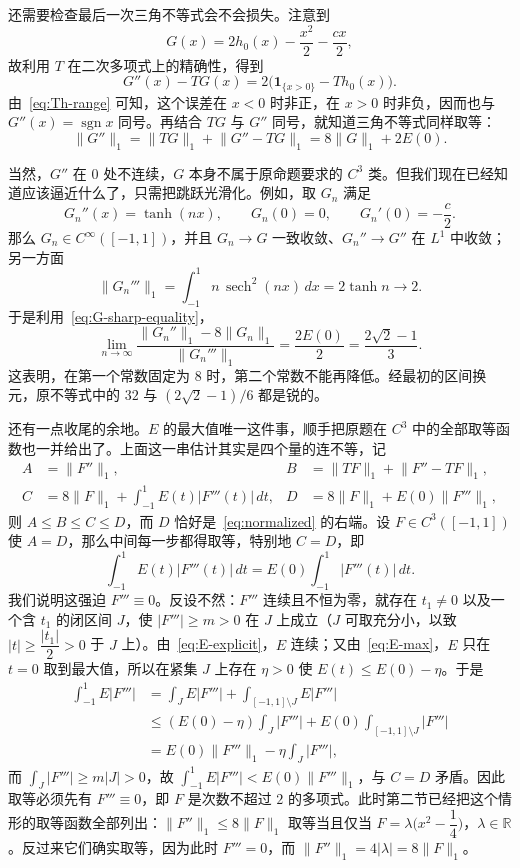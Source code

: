 \documentclass[UTF8,fontset=windows,a4paper,11pt]{ctexart}
\newcommand{\Lone}[1]{\lVert #1\rVert_1}
\begin{document}
还需要检查最后一次三角不等式会不会损失。注意到
\[
    G(x)=2h_0(x)-\frac{x^2}{2}-\frac{cx}{2},
\]
故利用 $T$ 在二次多项式上的精确性，得到
\[
    G''(x)-TG(x)=2\bigl(\mathbf1_{\{x>0\}}-Th_0(x)\bigr).
\]
由~\eqref{eq:Th-range} 可知，这个误差在 $x<0$ 时非正，在 $x>0$ 时非负，因而也与 $G''(x)=\operatorname{sgn}x$ 同号。再结合 $TG$ 与 $G''$ 同号，就知道三角不等式同样取等：
\begin{equation}
    \Lone{G''}
    =\Lone{TG}+\Lone{G''-TG}
    =8\Lone{G}+2E(0).
    \label{eq:G-sharp-equality}
\end{equation}

当然，$G''$ 在 $0$ 处不连续，$G$ 本身不属于原命题要求的 $C^3$ 类。但我们现在已经知道应该逼近什么了，只需把跳跃光滑化。例如，取 $G_n$ 满足
\[
    G_n''(x)=\tanh(nx),\qquad
    G_n(0)=0,\qquad G_n'(0)=-\frac{c}{2}.
\]
那么 $G_n\in C^{\infty}([-1,1])$，并且 $G_n\to G$ 一致收敛、$G_n''\to G''$ 在 $L^1$ 中收敛；另一方面
\[
    \Lone{G_n'''}=\int_{-1}^{1}n\,\operatorname{sech}^2(nx)\,dx
    =2\tanh n\longrightarrow2.
\]
于是利用~\eqref{eq:G-sharp-equality}，
\begin{equation}
    \lim_{n\to\infty}
    \frac{\Lone{G_n''}-8\Lone{G_n}}{\Lone{G_n'''}}
    =\frac{2E(0)}2
    =\frac{2\sqrt{2}-1}{3}.
    \label{eq:sharp-limit}
\end{equation}
这表明，在第一个常数固定为 $8$ 时，第二个常数不能再降低。经最初的区间换元，原不等式中的 $32$ 与 $(2\sqrt{2}-1)/6$ 都是锐的。

还有一点收尾的余地。$E$ 的最大值唯一这件事，顺手把原题在 $C^3$ 中的全部取等函数也一并给出了。上面这一串估计其实是四个量的连不等，记
\[
    \begin{aligned}
    A&=\Lone{F''}, & B&=\Lone{TF}+\Lone{F''-TF},\\
    C&=8\Lone{F}+\int_{-1}^{1}E(t)|F'''(t)|\,dt, &
    D&=8\Lone{F}+E(0)\Lone{F'''},
    \end{aligned}
\]
则 $A\le B\le C\le D$，而 $D$ 恰好是~\eqref{eq:normalized} 的右端。设 $F\in C^3([-1,1])$ 使 $A=D$，那么中间每一步都得取等，特别地 $C=D$，即
\[
    \int_{-1}^{1}E(t)|F'''(t)|\,dt=E(0)\int_{-1}^{1}|F'''(t)|\,dt.
\]
我们说明这强迫 $F'''\equiv0$。反设不然：$F'''$ 连续且不恒为零，就存在 $t_1\ne0$ 以及一个含 $t_1$ 的闭区间 $J$，使 $|F'''|\ge m>0$ 在 $J$ 上成立（$J$ 可取充分小，以致 $|t|\ge\dfrac{|t_1|}{2}>0$ 于 $J$ 上）。由~\eqref{eq:E-explicit}，$E$ 连续；又由~\eqref{eq:E-max}，$E$ 只在 $t=0$ 取到最大值，所以在紧集 $J$ 上存在 $\eta>0$ 使 $E(t)\le E(0)-\eta$。于是
\[
    \begin{aligned}
    \int_{-1}^{1}E|F'''|
    &=\int_{J}E|F'''|+\int_{[-1,1]\setminus J}E|F'''|\\
    &\le(E(0)-\eta)\int_{J}|F'''|+E(0)\int_{[-1,1]\setminus J}|F'''|\\
    &=E(0)\Lone{F'''}-\eta\int_{J}|F'''|,
    \end{aligned}
\]
而 $\displaystyle\int_{J}|F'''|\ge m|J|>0$，故 $\displaystyle\int_{-1}^{1}E|F'''|<E(0)\Lone{F'''}$，与 $C=D$ 矛盾。因此取等必须先有 $F'''\equiv0$，即 $F$ 是次数不超过 $2$ 的多项式。此时第二节已经把这个情形的取等函数全部列出：$\Lone{F''}\le8\Lone{F}$ 取等当且仅当 $F=\lambda\bigl(x^2-\dfrac14\bigr)$，$\lambda\in\mathbb{R}$。反过来它们确实取等，因为此时 $F'''=0$，而 $\Lone{F''}=4|\lambda|=8\Lone{F}$。
\end{document}
